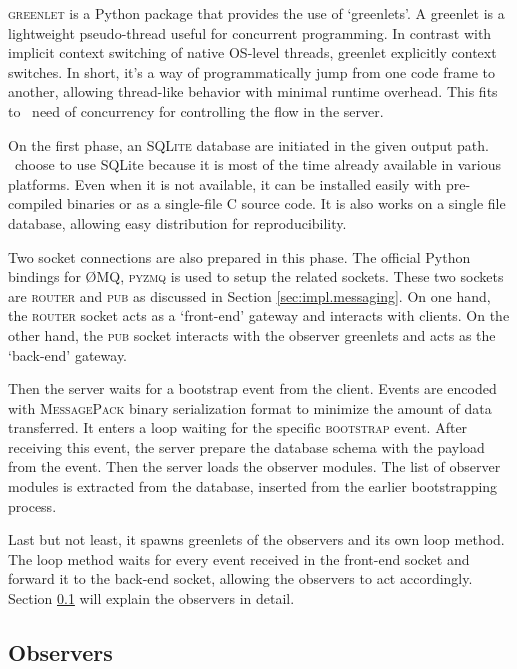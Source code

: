 \textsc{greenlet} is a Python package that provides the use of `greenlets'.
A greenlet is a lightweight pseudo-thread useful for concurrent programming.
In contrast with implicit context switching of native OS-level threads, greenlet explicitly context switches.
In short, it's a way of programmatically jump from one code frame to another, allowing thread-like behavior with minimal runtime overhead.
This fits to \firstposs~need of concurrency for controlling the flow in the server.

On the first phase, an \textsc{SQLite} database are initiated in the given output path.
\First~choose to use SQLite because it is most of the time already available in various platforms.
Even when it is not available, it can be installed easily with pre-compiled binaries or as a single-file C source code.
It is also works on a single file database, allowing easy distribution for reproducibility.

Two socket connections are also prepared in this phase.
The official Python bindings for \O MQ, \textsc{pyzmq} is used to setup the related sockets.
These two sockets are \textsc{router} and \textsc{pub} as discussed in Section \ref{sec:impl.messaging}.
On one hand, the \textsc{router} socket acts as a `front-end' gateway and interacts with clients.
On the other hand, the \textsc{pub} socket interacts with the observer greenlets and acts as the `back-end' gateway.

Then the server waits for a bootstrap event from the client.
Events are encoded with \textsc{MessagePack} binary serialization format to minimize the amount of data transferred.
It enters a loop waiting for the specific \textsc{bootstrap} event.
After receiving this event, the server prepare the database schema with the payload from the event.
Then the server loads the observer modules.
The list of observer modules is extracted from the database, inserted from the earlier bootstrapping process.

Last but not least, it spawns greenlets of the observers and its own loop method.
The loop method waits for every event received in the front-end socket and forward it to the back-end socket, allowing the observers to act accordingly.
Section \ref{sec:impl.observers} will explain the observers in detail.



\subsection{Observers}
\label{sec:impl.observers}

